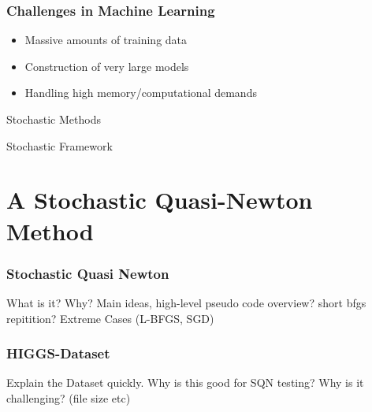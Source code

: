 \documentclass[10pt]{beamer}
\begin{document}
  \begin{frame}
    \frametitle{Challenges in Machine Learning}
      \begin{itemize}
        \item Massive amounts of training data 
        \item Construction of very large models
        \item Handling high memory/computational demands
      \end{itemize}
      \vspace{36pt}
    \centering\alert{Stochastic Methods}
  \end{frame}
  
  \begin{frame}{Stochastic Framework}
  	
  \end{frame}

\section{A Stochastic Quasi-Newton Method}
  \begin{frame}
    \frametitle{Stochastic Quasi Newton}
      What is it?
      Why?
      Main ideas, high-level pseudo code overview?
      short bfgs repitition?
      Extreme Cases (L-BFGS, SGD)
  \end{frame}

  \begin{frame}
    \frametitle{HIGGS-Dataset}
    Explain the Dataset quickly.
    Why is this good for SQN testing?
    Why is it challenging? (file size etc)
  \end{frame}
\end{document}
